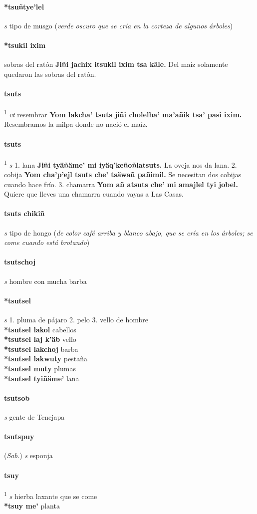 \documentclass{scrbook}
\newcommand{\entry}[1]{\paragraph{#1}}
\newcommand{\onedefinition}[1]{#1.}
\newcommand{\defsuperscript}[1]{\textsuperscript{1}}
\newcommand{\partofspeech}[1]{\textit{#1}}
\newcommand{\spanishtranslation}[1]{#1}
\newcommand{\clarification}[1]{(\textit{#1})}
\newcommand{\cholexample}[1]{\textbf{#1}}
\newcommand{\exampletranslation}[1]{#1}
\newcommand{\relevantdialect}[1]{(\textit{#1})}
\newcommand{\secondaryentry}[1]{\\\textbf{#1}}
\newcommand{\secondtranslation}[1]{#1}
\begin{document}
\begin{multicols}{2}
\entry{*tsuñtye'lel}
\partofspeech{s}
\spanishtranslation{tipo de musgo}
\clarification{verde oscuro que se cría en la corteza de algunos árboles}

\entry{*tsukil ixim}
\spanishtranslation{sobras del ratón}
\cholexample{Jiñi jachix itsukil ixim tsa käle.}
\exampletranslation{Del maíz solamente quedaron las sobras del ratón.}

\entry{tsuts}
\defsuperscript{1}
\partofspeech{vt}
\spanishtranslation{resembrar}
\cholexample{Yom lakcha' tsuts jiñi cholelba' ma'añik tsa' pasi ixim.}
\exampletranslation{Resembramos la milpa donde no nació el maíz.}

\entry{tsuts}
\defsuperscript{2}
\partofspeech{s}
\onedefinition{1}
\spanishtranslation{lana}
\cholexample{Jiñi tyäñäme' mi iyäq'keñoñlatsuts.}
\exampletranslation{La oveja nos da lana.}
\onedefinition{2}
\spanishtranslation{cobija}
\cholexample{Yom cha'p'ejl tsuts che' tsäwañ pañimil.}
\exampletranslation{Se necesitan dos cobijas cuando hace frío.}
\onedefinition{3}
\spanishtranslation{chamarra}
\cholexample{Yom añ atsuts che' mi amajlel tyi jobel.}
\exampletranslation{Quiere que lleves una chamarra cuando vayas a Las Casas.}

\entry{tsuts chikiñ}
\partofspeech{s}
\spanishtranslation{tipo de hongo}
\clarification{de color café arriba y blanco abajo, que se cría en los árboles; se come cuando está brotando}

\entry{tsutschoj}
\partofspeech{s}
\spanishtranslation{hombre con mucha barba}

\entry{*tsutsel}
\partofspeech{s}
\onedefinition{1}
\spanishtranslation{pluma de pájaro}
\onedefinition{2}
\spanishtranslation{pelo}
\onedefinition{3}
\spanishtranslation{vello de hombre}
\secondaryentry{*tsutsel lakol}
\secondtranslation{cabellos}
\secondaryentry{*tsutsel laj k'äb}
\secondtranslation{vello}
\secondaryentry{*tsutsel lakchoj}
\secondtranslation{barba}
\secondaryentry{*tsutsel lakwuty}
\secondtranslation{pestaña}
\secondaryentry{*tsutsel muty}
\secondtranslation{plumas}
\secondaryentry{*tsutsel tyiñäme'}
\secondtranslation{lana}

\entry{tsutsob}
\partofspeech{s}
\spanishtranslation{gente de Tenejapa}

\entry{tsutspuy}
\relevantdialect{Sab.}
\partofspeech{s}
\spanishtranslation{esponja}

\entry{tsuy}
\defsuperscript{1}
\partofspeech{s}
\spanishtranslation{hierba laxante que se come}
\secondaryentry{*tsuy me'}
\secondtranslation{planta}


\end{multicols}
\end{document}
